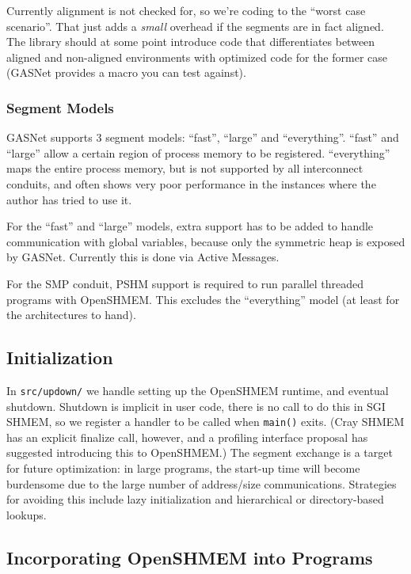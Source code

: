 \documentclass[english]{article}
\begin{document}
Currently alignment is not checked for, so we're coding to the
``worst case scenario''. That just adds a \emph{small} overhead if
the segments are in fact aligned. The library should at some point
introduce code that differentiates between aligned and non-aligned
environments with optimized code for the former case (GASNet provides
a macro you can test against).

\subsubsection{Segment Models}

GASNet supports 3 segment models: ``fast'', ``large'' and
``everything''.  ``fast'' and ``large'' allow a certain region of
process memory to be registered.  ``everything'' maps the entire
process memory, but is not supported by all interconnect conduits, and
often shows very poor performance in the instances where the author
has tried to use it.

For the ``fast'' and ``large'' models, extra support has to be added
to handle communication with global variables, because only the
symmetric heap is exposed by GASNet. Currently this is done via Active
Messages.

For the SMP conduit, PSHM support is required to run parallel threaded
programs with OpenSHMEM. This excludes the ``everything'' model (at
least for the architectures to hand).

\subsection{Initialization}

In \texttt{src/updown/} we handle setting up the OpenSHMEM runtime,
and eventual shutdown. Shutdown is implicit in user code, there is no
call to do this in SGI SHMEM, so we register a handler to be called
when \texttt{main()} exits. (Cray SHMEM has an explicit finalize call,
however, and a profiling interface proposal has suggested introducing
this to OpenSHMEM.) The segment exchange is a target for future
optimization: in large programs, the start-up time will become
burdensome due to the large number of address/size
communications. Strategies for avoiding this include lazy
initialization and hierarchical or directory-based lookups.

\subsection{Incorporating OpenSHMEM into Programs}
\end{document}
